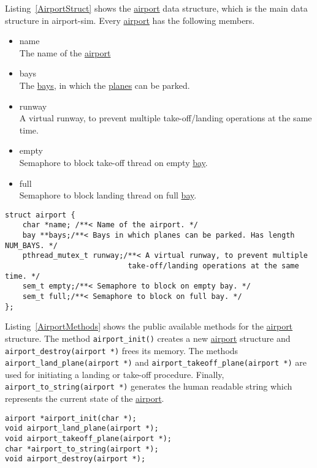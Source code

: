 \documentclass[a4paper, 12pt]{scrartcl} %
\begin{document}
\label{sec:airport}
Listing~\ref{AirportStruct} shows the \hyperref[sec:airport]{airport} data
structure, which is the main data structure in airport-sim. Every
\hyperref[sec:airport]{airport} has the following members.
\begin{itemize}
  \item{name} \\
    The name of the \hyperref[sec:airport]{airport}
  \item{bays} \\
    The \hyperref[sec:bay]{bays}, in which the \hyperref[sec:plane]{planes} can
    be parked.
  \item{runway} \\
    A virtual runway, to prevent multiple take-off/landing operations at the
    same time.
  \item{empty} \\
    Semaphore to block take-off thread on empty \hyperref[sec:bay]{bay}.
  \item{full} \\
    Semaphore to block landing thread on full \hyperref[sec:bay]{bay}.
\end{itemize}
\begin{lstlisting}
struct airport {
    char *name; /**< Name of the airport. */
    bay **bays;/**< Bays in which planes can be parked. Has length NUM_BAYS. */
    pthread_mutex_t runway;/**< A virtual runway, to prevent multiple
                            take-off/landing operations at the same time. */
    sem_t empty;/**< Semaphore to block on empty bay. */
    sem_t full;/**< Semaphore to block on full bay. */
};
\end{lstlisting}
Listing~\ref{AirportMethods} shows the public available methods for the
\hyperref[sec:airport]{airport} structure. The method \texttt{airport\_init()}
creates a new \hyperref[sec:airport]{airport} structure and
\texttt{airport\_destroy(airport *)} frees its memory. The methods
\texttt{airport\_land\_plane(airport *)} and
\texttt{airport\_takeoff\_plane(airport *)} are used for initiating a landing
or take-off procedure. Finally, \texttt{airport\_to\_string(airport *)}
generates the human readable string which represents the current state of the
\hyperref[sec:airport]{airport}.
\begin{lstlisting}
airport *airport_init(char *);
void airport_land_plane(airport *);
void airport_takeoff_plane(airport *);
char *airport_to_string(airport *);
void airport_destroy(airport *);
\end{lstlisting}
\end{document}
